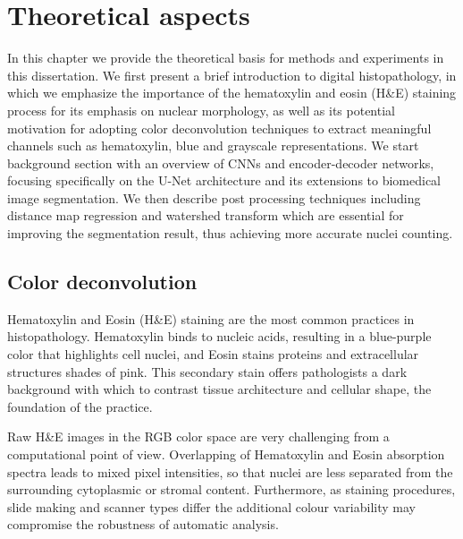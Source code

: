 \documentclass[target=bach,aauheader=,style=]{thud}
\begin{document}
\chapter{Theoretical aspects}
\label{sec:theory}
In this chapter we provide the theoretical basis for methods and experiments in this dissertation.
We first present a brief introduction to digital histopathology, in which we emphasize the importance of the hematoxylin and eosin (H\&E) staining process for its emphasis on nuclear morphology, as well as its potential motivation for adopting color deconvolution techniques to extract meaningful channels such as hematoxylin, blue and grayscale representations.
We start background section with an overview of CNNs and encoder-decoder networks, focusing specifically on the U-Net architecture and its extensions to biomedical image segmentation.
We then describe post processing techniques including distance map regression and watershed transform which are essential for improving the segmentation result, thus achieving more accurate nuclei counting.
\section{Color deconvolution}
Hematoxylin and Eosin (H\&E) staining are the most common practices in histopathology.
Hematoxylin binds to nucleic acids, resulting in a blue-purple color that highlights cell nuclei, and Eosin stains proteins and extracellular structures shades of pink.
This secondary stain offers pathologists a dark background with which to contrast tissue architecture and cellular shape, the foundation of the practice.

Raw H\&E images in the RGB color space are very challenging from a computational point of view.
Overlapping of Hematoxylin and Eosin absorption spectra leads to mixed pixel intensities, so that nuclei are less separated from the surrounding cytoplasmic or stromal content.
Furthermore, as staining procedures, slide making and scanner types differ the additional colour variability may compromise the robustness of automatic analysis.
\end{document}
